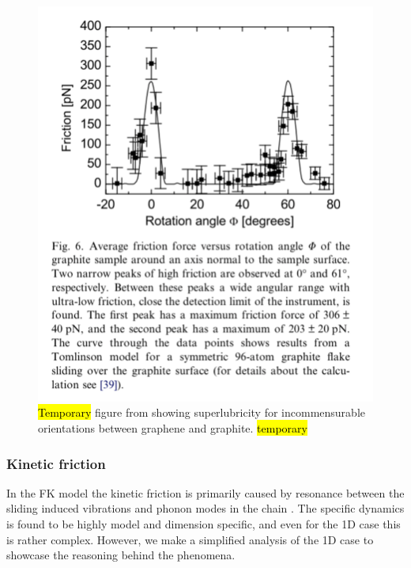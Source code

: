 \begin{figure}[H]
  \centering
  \includegraphics[width=0.5\linewidth]{figures/theory/graphene_rot.png}
  \caption{\hl{Temporary} figure from \cite{DIENWIEBEL2005197} showing superlubricity for incommensurable orientations between graphene and graphite. \hl{temporary}}
  \label{fig:graphene_rot}
\end{figure}





\subsubsection{Kinetic friction}





In the FK model the kinetic friction is primarily caused by resonance between
the sliding induced vibrations and phonon modes in the chain \cite{FK2D}. The specific dynamics is found to be highly model and dimension specific, and even for the 1D case this is rather complex. However, we make a simplified analysis of the 1D case to showcase the reasoning behind the phenomena.

